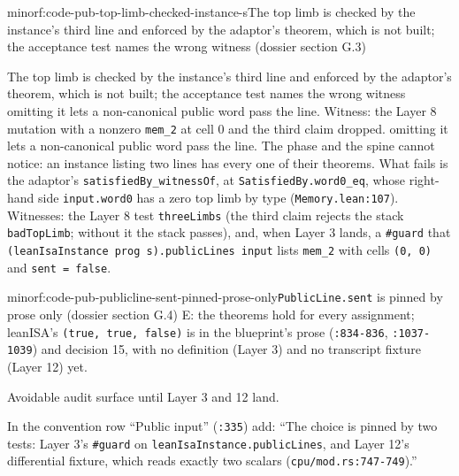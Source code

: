\begin{finding}{minor}{f:code-pub-top-limb-checked-instance-s}{The top limb is checked by the instance's third line and enforced by the adaptor's theorem, which is not built; the acceptance test names the wrong witness (dossier section G.3)}
\begin{change}{The top limb is checked by the instance's third line and enforced by the adaptor's theorem, which is not built; the acceptance test names the wrong witness}
\asis omitting it lets a non-canonical public word pass the line. Witness: the Layer 8 mutation with a nonzero \texttt{mem\_\allowbreak{}2} at cell 0 and the third claim dropped.
\asproposed omitting it lets a non-canonical public word pass the line. The phase and the spine cannot notice: an instance listing two lines has every one of their theorems. What fails is the adaptor's \texttt{satisfiedBy\_\allowbreak{}witnessOf}, at \texttt{SatisfiedBy.\allowbreak{}word0\_\allowbreak{}eq}, whose right-hand side \texttt{input.\allowbreak{}word0} has a zero top limb by type (\texttt{Memory.\allowbreak{}lean:107}). Witnesses: the Layer 8 test \texttt{threeLimbs} (the third claim rejects the stack \texttt{badTopLimb}; without it the stack passes), and, when Layer 3 lands, a \texttt{\#guard} that \texttt{(\allowbreak{}l\allowbreak{}e\allowbreak{}a\allowbreak{}n\allowbreak{}I\allowbreak{}s\allowbreak{}a\allowbreak{}I\allowbreak{}n\allowbreak{}s\allowbreak{}t\allowbreak{}a\allowbreak{}n\allowbreak{}c\allowbreak{}e\allowbreak{} p\allowbreak{}r\allowbreak{}o\allowbreak{}g\allowbreak{} s\allowbreak{})\allowbreak{}.\allowbreak{}p\allowbreak{}u\allowbreak{}b\allowbreak{}l\allowbreak{}i\allowbreak{}c\allowbreak{}L\allowbreak{}i\allowbreak{}n\allowbreak{}e\allowbreak{}s\allowbreak{} i\allowbreak{}n\allowbreak{}p\allowbreak{}u\allowbreak{}t} lists \texttt{mem\_\allowbreak{}2} with cells \texttt{(\allowbreak{}0,\allowbreak{} 0)} and \texttt{sent = false}.
\end{change}

\end{finding}

\begin{finding}{minor}{f:code-pub-publicline-sent-pinned-prose-only}{\texttt{PublicLine.\allowbreak{}sent} is pinned by prose only (dossier section G.4)}
E: the theorems hold for every assignment; leanISA's \texttt{(\allowbreak{}true,\allowbreak{} true,\allowbreak{} false)} is in the blueprint's prose (\texttt{:834-{}836}, \texttt{:1037-{}1039}) and decision 15, with no definition (Layer 3) and no transcript fixture (Layer 12) yet.

Avoidable audit surface until Layer 3 and 12 land.

In the convention row \enquote{Public input} (\texttt{:335}) add: \enquote{The choice is pinned by two tests: Layer 3's \texttt{\#guard} on \texttt{leanIsaInstance.\allowbreak{}publicLines}, and Layer 12's differential fixture, which reads exactly two scalars (\texttt{cpu/\allowbreak{}mod.\allowbreak{}rs:747-{}749}).}

\end{finding}


